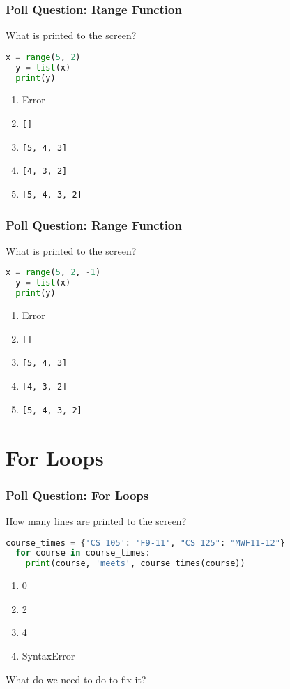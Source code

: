\documentclass{beamer}
\begin{document}
%
%
\begin{frame}[fragile]
  \frametitle{Poll Question: Range Function}
  What is printed to the screen?
  \begin{lstlisting}[language=Python, autogobble]
  x = range(5, 2)
  y = list(x)
  print(y)
  \end{lstlisting}
  \vfill
  \begin{enumerate}[A]
    \item Error
    \item \lstinline|[]|
    \item \lstinline|[5, 4, 3]|
    \item \lstinline|[4, 3, 2]|
    \item \lstinline|[5, 4, 3, 2]|
  \end{enumerate}
\end{frame}

%
%
\begin{frame}[fragile]
  \frametitle{Poll Question: Range Function}
  What is printed to the screen?
  \begin{lstlisting}[language=Python, autogobble]
  x = range(5, 2, -1)
  y = list(x)
  print(y)
  \end{lstlisting}
  \vfill
  \begin{enumerate}[A]
    \item Error
    \item \lstinline|[]|
    \item \lstinline|[5, 4, 3]|
    \item \lstinline|[4, 3, 2]|
    \item \lstinline|[5, 4, 3, 2]|
  \end{enumerate}
\end{frame}

\section{For Loops}

%
%
\begin{frame}[fragile]
  \frametitle{Poll Question: For Loops}
  How many lines are printed to the screen?
  \begin{lstlisting}[language=Python, autogobble]
  course_times = {'CS 105': 'F9-11', "CS 125": "MWF11-12"}
  for course in course_times:
    print(course, 'meets', course_times(course))
  \end{lstlisting}
  \vfill
  \begin{enumerate}[A]
    \item 0
    \item 2
    \item 4
    \item SyntaxError
  \end{enumerate}
  \pause
  What do we need to do to fix it?
\end{frame}
\end{document}
